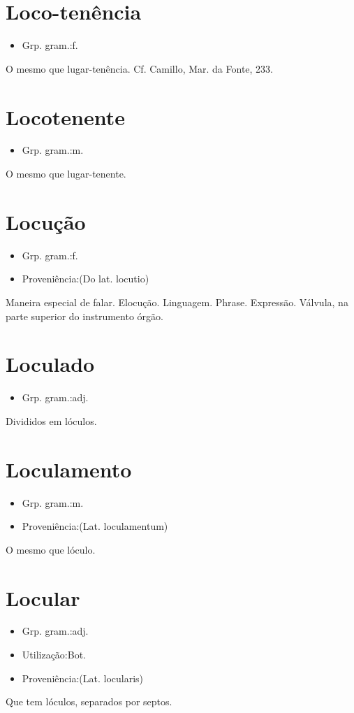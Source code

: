 \section{Loco-tenência}
\begin{itemize}
\item {Grp. gram.:f.}
\end{itemize}
O mesmo que \textunderscore lugar-tenência\textunderscore . Cf. Camillo, \textunderscore Mar. da Fonte\textunderscore , 233.
\section{Locotenente}
\begin{itemize}
\item {Grp. gram.:m.}
\end{itemize}
O mesmo que \textunderscore lugar-tenente\textunderscore .
\section{Locução}
\begin{itemize}
\item {Grp. gram.:f.}
\end{itemize}
\begin{itemize}
\item {Proveniência:(Do lat. \textunderscore locutio\textunderscore )}
\end{itemize}
Maneira especial de falar.
Elocução.
Linguagem.
Phrase.
Expressão.
Válvula, na parte superior do instrumento órgão.
\section{Loculado}
\begin{itemize}
\item {Grp. gram.:adj.}
\end{itemize}
Divididos em lóculos.
\section{Loculamento}
\begin{itemize}
\item {Grp. gram.:m.}
\end{itemize}
\begin{itemize}
\item {Proveniência:(Lat. \textunderscore loculamentum\textunderscore )}
\end{itemize}
O mesmo que \textunderscore lóculo\textunderscore .
\section{Locular}
\begin{itemize}
\item {Grp. gram.:adj.}
\end{itemize}
\begin{itemize}
\item {Utilização:Bot.}
\end{itemize}
\begin{itemize}
\item {Proveniência:(Lat. \textunderscore locularis\textunderscore )}
\end{itemize}
Que tem lóculos, separados por septos.
